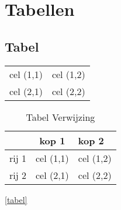 \chapter{Tabellen}
\label{tabellen}

\section{Tabel}

\blindtext

\begin{table}[h!]
	\begin{tabular}{lr}
	cel (1,1)
	& cel (1,2)
	\\
	cel (2,1)
	& cel (2,2)
	\end{tabular}
\end{table}

\blindtext

\begin{table}[h!]
	\label{tabel}
	\centering
	\begin{tabular}{|l|c|l|}
	\hline
	
	& kop 1
	& kop 2
	\\ \hline
	rij 1
	& cel (1,1)
	& cel (1,2)
	\\
	rij 2
	& cel (2,1)
	& cel (2,2)
	\\ \hline
	\end{tabular}
	\caption{Tabel Verwijzing}
\end{table}

\blindtext

\autoref{tabel}
